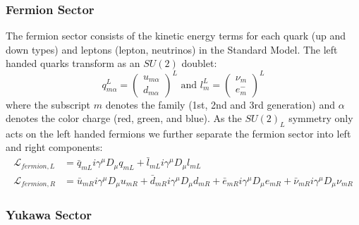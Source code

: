\subsubsection{Fermion Sector}

The fermion sector consists of the kinetic energy terms for each quark (up and down types) and leptons (lepton, neutrinos) in the Standard Model.
The left handed quarks transform as an $SU(2)$ doublet:
\begin{equation}
q_{m\alpha}^L = \left( \begin{array}{c} u_{m\alpha}  \\ d_{m\alpha} \end{array} \right)^L \text{ and } l_{m}^L = \left( \begin{array}{c} \nu_{m}  \\ e^{-}_{m} \end{array} \right)^L 
\end{equation}
where the subscript $m$ denotes the family (1st, 2nd and 3rd generation) and $\alpha$ denotes the color charge (red, green, and blue).
As the $SU(2)_L$ symmetry only acts on the left handed fermions we further separate the fermion sector into left and right components:
\begin{align*}
\mathcal{L}_{fermion,L} &= \bar{q}_{mL} i \gamma^\mu D_\mu q_{mL} + \bar{l}_{mL} i \gamma^\mu D_\mu l_{mL}\\
\mathcal{L}_{fermion,R} &=  \bar{u}_{mR} i \gamma^\mu D_\mu u_{mR} 
+ \bar{d}_{mR} i \gamma^\mu D_\mu d_{mR} + \bar{e}_{mR} i \gamma^\mu D_\mu e_{mR} + \bar{\nu}_{mR} i \gamma^\mu D_\mu \nu_{mR}
\end{align*}

\subsubsection{Yukawa Sector}

